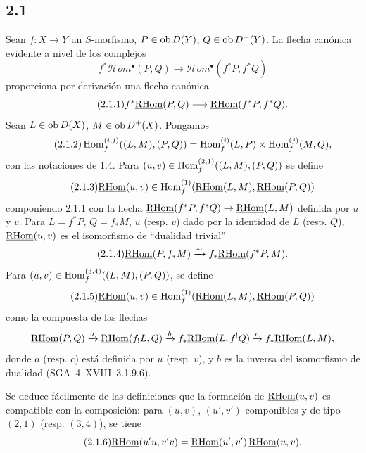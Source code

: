 \subsection*{2.1}
Sean $f:X\to Y$ un $S$-morfismo, $P\in\operatorname{ob} D(Y)$, $Q\in\operatorname{ob} D^{+}(Y)$. La flecha canónica evidente a nivel de los complejos
\[
f^{*}\mathcal Hom^{\bullet}(P,Q)\longrightarrow\mathcal Hom^{\bullet}(f^{*}P,f^{*}Q)
\]
proporciona por derivación una flecha canónica
\begin{equation}\tag{2.1.1}
f^{*}\underline{\mathrm{RHom}}(P,Q)\longrightarrow\underline{\mathrm{RHom}}(f^{*}P,f^{*}Q).
\end{equation}
Sean $L\in\operatorname{ob} D(X)$, $M\in\operatorname{ob} D^{+}(X)$. Pongamos
\begin{equation}\tag{2.1.2}
\operatorname{Hom}_f^{(i,j)}((L,M),(P,Q))=\operatorname{Hom}_f^{(i)}(L,P)\times\operatorname{Hom}_f^{(j)}(M,Q),
\end{equation}
con las notaciones de 1.4. Para $(u,v)\in\operatorname{Hom}_f^{(2,1)}((L,M),(P,Q))$ se define
\begin{equation}\tag{2.1.3}
\underline{\mathrm{RHom}}(u,v)\in\operatorname{Hom}_f^{(1)}(\underline{\mathrm{RHom}}(L,M),\underline{\mathrm{RHom}}(P,Q))
\end{equation}
componiendo 2.1.1 con la flecha $\underline{\mathrm{RHom}}(f^{*}P,f^{*}Q)\to\underline{\mathrm{RHom}}(L,M)$ definida por $u$ y $v$. Para $L=f^{*}P$, $Q=f_{*}M$, $u$ (resp. $v$) dado por la identidad de $L$ (resp. $Q$), $\underline{\mathrm{RHom}}(u,v)$ es el isomorfismo de ``dualidad trivial''
\begin{equation}\tag{2.1.4}
\underline{\mathrm{RHom}}(P,f_{*}M)\xrightarrow{\sim}f_{*}\underline{\mathrm{RHom}}(f^{*}P,M).
\end{equation}
Para $(u,v)\in\operatorname{Hom}_f^{(3,4)}((L,M),(P,Q))$, se define
\begin{equation}\tag{2.1.5}
\underline{\mathrm{RHom}}(u,v)\in\operatorname{Hom}_f^{(1)}(\underline{\mathrm{RHom}}(L,M),\underline{\mathrm{RHom}}(P,Q))
\end{equation}
como la compuesta de las flechas
\[
\underline{\mathrm{RHom}}(P,Q)\xrightarrow{a}\underline{\mathrm{RHom}}(f_{!}L,Q)\xrightarrow{b}f_{*}\underline{\mathrm{RHom}}(L,f^{!}Q)\xrightarrow{c}f_{*}\underline{\mathrm{RHom}}(L,M),
\]
donde $a$ (resp. $c$) está definida por $u$ (resp. $v$), y $b$ es la inversa del isomorfismo de dualidad (SGA~4~XVIII~3.1.9.6).

Se deduce fácilmente de las definiciones que la formación de $\underline{\mathrm{RHom}}(u,v)$ es compatible con la composición: para $(u,v)$, $(u',v')$ componibles y de tipo $(2,1)$ (resp. $(3,4)$), se tiene
\begin{equation}\tag{2.1.6}
\underline{\mathrm{RHom}}(u'u,v'v)=\underline{\mathrm{RHom}}(u',v')\,\underline{\mathrm{RHom}}(u,v).
\end{equation}

